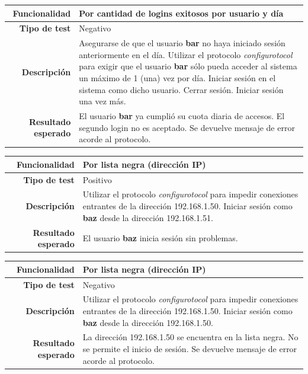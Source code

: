 \documentclass[a4paper,10pt]{article}
\begin{document}
\begin{center}
  \begin{tabular}{|r|p{12.5cm}|}
    \hline
    \textbf{Funcionalidad}	&	Por cantidad de logins exitosos por usuario y día\\
    \hline
    \textbf{Tipo de test}	&	Negativo\\
    \hline
    \textbf{Descripción}	&	Asegurarse de que el usuario \textbf{bar} no haya iniciado sesión
					anteriormente en el día.
					Utilizar el protocolo \textit{configurotocol} para exigir que el usuario
					\textbf{bar} sólo pueda acceder al sistema un máximo de 1 (una) vez
					por día. Iniciar sesión en el sistema como dicho usuario. Cerrar sesión.
					Iniciar sesión una vez más.\\
    \hline
    \textbf{Resultado esperado}	&	El usuario \textbf{bar} ya cumplió su cuota diaria de accesos.
					El segundo login no es aceptado. Se devuelve mensaje de error acorde al protocolo.\\
    \hline   
  \end{tabular}
\end{center}

\begin{center}
  \begin{tabular}{|r|p{12.5cm}|}
    \hline
    \textbf{Funcionalidad}	&	Por lista negra (dirección IP)\\
    \hline
    \textbf{Tipo de test}	&	Positivo\\
    \hline
    \textbf{Descripción}	&	Utilizar el protocolo \textit{configurotocol} para impedir conexiones
					entrantes de la dirección 192.168.1.50. Iniciar sesión como
					\textbf{baz} desde la dirección 192.168.1.51.\\
    \hline
    \textbf{Resultado esperado}	&	El usuario \textbf{baz} inicia sesión sin problemas.\\
    \hline   
  \end{tabular}
\end{center}

\begin{center}
  \begin{tabular}{|r|p{12.5cm}|}
    \hline
    \textbf{Funcionalidad}	&	Por lista negra (dirección IP)\\
    \hline
    \textbf{Tipo de test}	&	Negativo\\
    \hline
    \textbf{Descripción}	&	Utilizar el protocolo \textit{configurotocol} para impedir conexiones
					entrantes de la dirección 192.168.1.50. Iniciar sesión como
					\textbf{baz} desde la dirección 192.168.1.50.\\
    \hline
    \textbf{Resultado esperado}	&	La dirección 192.168.1.50 se encuentra en la lista negra. No se permite
					el inicio de sesión. Se devuelve mensaje de error acorde al protocolo.\\
    \hline   
  \end{tabular}
\end{center}
\end{document}
